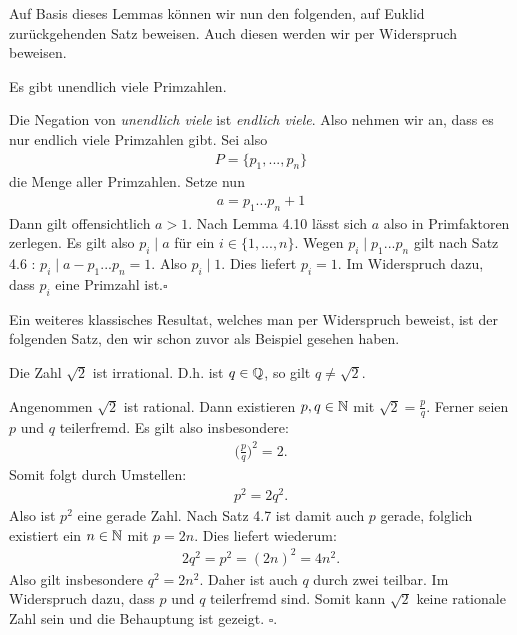 Auf Basis dieses Lemmas können wir nun den folgenden, auf Euklid zurückgehenden Satz beweisen. 
Auch diesen werden wir per Widerspruch beweisen. 

\begin{theorem}
    Es gibt unendlich viele Primzahlen. 
\end{theorem}

\begin{proof*}
    Die Negation von \textit{unendlich viele} ist \textit{endlich viele}. Also nehmen wir an, dass es nur endlich viele Primzahlen gibt. Sei also 
    \begin{align*}
        P = \{p_1,...,p_n\}
    \end{align*}
    die Menge aller Primzahlen. Setze nun
    \begin{align*}
        a = p_1 ... p_n + 1 
    \end{align*}
    Dann gilt offensichtlich $a>1$. Nach Lemma 4.10 lässt sich $a$ also in Primfaktoren zerlegen. Es gilt also $p_i \mid a$ für ein $i \in \{1,...,n\}$. 
    Wegen $p_i \mid p_1 ... p_n$ gilt nach Satz 4.6 : $p_i \mid a - p_1 ... p_n = 1$. Also $p_i \mid 1$. Dies liefert $p_i = 1$. Im Widerspruch dazu, dass $p_i$ eine Primzahl ist.\hfill $\square$ 
\end{proof*}

Ein weiteres klassisches Resultat, welches man per Widerspruch beweist, ist der folgenden Satz, den wir schon zuvor als Beispiel gesehen haben. 
\begin{theorem}
    Die Zahl $\sqrt{2}$ ist irrational. D.h. ist $q \in \mathbb{Q}$, so gilt $q \neq \sqrt{2}$. 
\end{theorem}
\begin{proof*}
    Angenommen $\sqrt{2}$ ist rational. Dann existieren $p,q \in \mathbb{N}$ mit $\sqrt{2} = \frac{p}{q}$. Ferner seien $p$ und $q$ teilerfremd. 
    Es gilt also insbesondere: 
    \begin{align*}
        \big(\frac{p}{q}\big)^2 = 2 . 
    \end{align*}
    Somit folgt durch Umstellen: 
    \begin{align*}
        p^2 = 2q^2.
    \end{align*}
    Also ist $p^2$ eine gerade Zahl. Nach Satz 4.7 ist damit auch $p$ gerade, folglich existiert ein $n \in \mathbb{N}$ mit $p = 2n$. 
    Dies liefert wiederum: 
    \begin{align*}
        2q^2 = p^2 = (2n)^2 = 4n^2. 
    \end{align*}
    Also gilt insbesondere $q^2 = 2n^2$. Daher ist auch $q$ durch zwei teilbar. Im Widerspruch dazu, dass $p$ und $q$ teilerfremd sind. 
    Somit kann $\sqrt{2}$ keine rationale Zahl sein und die Behauptung ist gezeigt. \hfill $\square$. 

\end{proof*}

